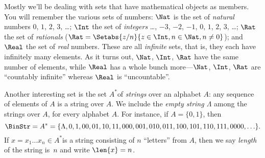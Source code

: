 \documentclass[../../include/open-logic-section]{subfiles}
\begin{document}

\begin{ex}
Mostly we'll be dealing with sets that have mathematical objects as
members. You will remember the various sets of numbers: $\Nat$
is the set of \emph{natural} numbers $0$, $1$, $2$, $3$, \dots{};
$\Int$ the set of \emph{integers} \ldots{}, $-3$, $-2$,
$-1$, $0$, $1$, $2$, $3$, \ldots{}; $\Rat$ the set of
\emph{rationals} ($\Rat = \Setabs{z/n}{z \in \Int, n \in \Nat, n \neq 0}$); and
$\Real$ the set of \emph{real} numbers. These are all \emph{infinite}
sets, that is, they each have infinitely many elements. As it turns
out, $\Nat$, $\Int$, $\Rat$ have the same number
of elements, while $\Real$ has a whole bunch more---$\Nat$,
$\Int$, $\Rat$ are ``countably infinite'' whereas
$\Real$ is ``uncountable''.
\end{ex}

\begin{ex}[Strings]
Another interesting set is the set $A^{*}$of
\emph{strings} over an alphabet $A$: any sequence of elements of
$A$ is a string over $A$. We include the \emph{empty string $\Lambda$}
among the strings over $A$, for every alphabet $A$. For instance,
if $A=\{0,1\}$, then 
\[
\BinStr = A^{*}
=\{\Lambda,0,1,00,01,10,11,000,001,010,011,100,101,110,111,0000,\ldots\}.
\]
 If $x=x_{1}\ldots x_{n}\in A^{*}$is a string consisting of $n$
``letters'' from $A$, then we say \emph{length} of the string is~$n$
and write $\len{x}=n$.
\end{ex}
\end{document}
